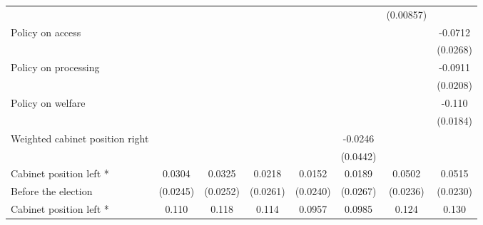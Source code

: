 \begin{table}[htbp]
\begin{tabular}{l*{7}{c}}
                    &                     &                     &                     &                     &                     &   (0.00857)         &                     \\
[0.5em]
Policy on access    &                     &                     &                     &                     &                     &                     &     -0.0712\sym{*}  \\
                    &                     &                     &                     &                     &                     &                     &    (0.0268)         \\
[0.5em]
Policy on processing&                     &                     &                     &                     &                     &                     &     -0.0911\sym{***}\\
                    &                     &                     &                     &                     &                     &                     &    (0.0208)         \\
[0.5em]
Policy on welfare   &                     &                     &                     &                     &                     &                     &      -0.110\sym{***}\\
                    &                     &                     &                     &                     &                     &                     &    (0.0184)         \\
[0.5em]
Weighted cabinet position right&                     &                     &                     &                     &     -0.0246         &                     &                     \\
                    &                     &                     &                     &                     &    (0.0442)         &                     &                     \\
[0.5em]
Cabinet position left *&      0.0304         &      0.0325         &      0.0218         &      0.0152         &      0.0189         &      0.0502\sym{*}  &      0.0515\sym{*}  \\
 Before the election                    &    (0.0245)         &    (0.0252)         &    (0.0261)         &    (0.0240)         &    (0.0267)         &    (0.0236)         &    (0.0230)         \\
[0.5em]
Cabinet position left * &       0.110\sym{***}&       0.118\sym{***}&       0.114\sym{***}&      0.0957\sym{***}&      0.0985\sym{***}&       0.124\sym{***}&       0.130\sym{***}\\

\end{tabular}
\end{table}

